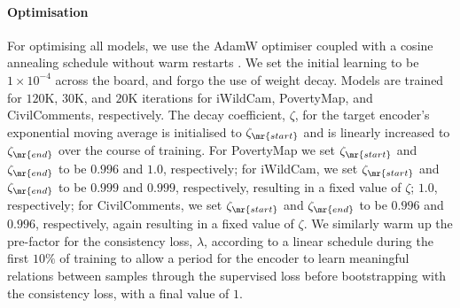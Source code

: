 \paragraph{Optimisation} For optimising all models, we use the AdamW optimiser
\citep{loshchilov2018decoupled} coupled with a cosine annealing schedule without warm restarts
\citep{DBLP:conf/iclr/LoshchilovH17}.
%
We set the initial learning to be $1 \times 10^{-4}$ across the board, and forgo the use of weight
decay. 
%
Models are trained for $120$K, $30$K, and $20$K iterations for iWildCam, PovertyMap, and
CivilComments, respectively.
%
The decay coefficient, $\zeta$, for the target encoder's exponential moving average is initialised
to $\zeta_{\mr{start}}$ and is linearly increased to $\zeta_{\mr{end}}$ over the course of
training. For PovertyMap we set $\zeta_{\mr{start}}$ and $\zeta_{\mr{end}}$ to be $0.996$ and
$1.0$, respectively; for iWildCam, we set $\zeta_{\mr{start}}$ and $\zeta_{\mr{end}}$ to be $0.999$
and $0.999$, respectively, resulting in a fixed value of $\zeta$; $1.0$, respectively; for
CivilComments, we set $\zeta_{\mr{start}}$ and $\zeta_{\mr{end}}$ to be $0.996$ and $0.996$,
respectively, again resulting in a fixed value of $\zeta$. 
We similarly warm up the pre-factor for the consistency loss, $\lambda$, according to a linear
schedule during the first $10\%$ of training to allow a period for the encoder to learn meaningful
relations between samples through the supervised loss before bootstrapping with the consistency
loss, with a final value of $1$.

